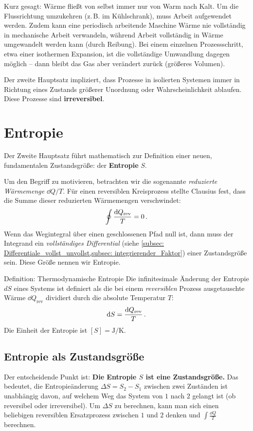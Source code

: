 Kurz gesagt: Wärme fließt von selbst immer nur von Warm nach Kalt. Um die Flussrichtung umzukehren (z.\,B. im Kühlschrank), muss Arbeit aufgewendet werden. Zudem kann eine periodisch arbeitende Maschine Wärme nie vollständig in mechanische Arbeit verwandeln, während Arbeit vollständig in Wärme umgewandelt werden kann (\zB durch Reibung). Bei einem einzelnen Prozessschritt, etwa einer isothermen Expansion, ist die vollständige Umwandlung dagegen möglich -- dann bleibt das Gas aber verändert zurück (größeres Volumen).

Der zweite Hauptsatz impliziert, dass Prozesse in isolierten Systemen immer in Richtung eines Zustands größerer Unordnung oder Wahrscheinlichkeit ablaufen. Diese Prozesse sind \textbf{irreversibel}.

\section{Entropie}\label{sec: entropie}
Der Zweite Hauptsatz führt mathematisch zur Definition einer neuen, fundamentalen Zustandsgröße: der \textbf{Entropie} $S$.

Um den Begriff zu motivieren, betrachten wir die sogenannte \textit{reduzierte Wärmemenge} $\dd Q/T$. Für einen reversiblen Kreisprozess stellte Clausius fest, dass die Summe dieser reduzierten Wärmemengen verschwindet:
\begin{equation}
    \oint \frac{\mathrm{d} Q_{\text{rev}}}{T} = 0 \,.
\end{equation}
Wenn das Wegintegral über einen geschlossenen Pfad null ist, dann muss der Integrand ein \textit{vollständiges Differential} (siehe \cref{subsec: Differentiale_vollst_unvollst,subsec: integrierender_Faktor}) einer Zustandsgröße sein. Diese Größe nennen wir Entropie.

\begin{importantbox}{Definition: Thermodynamische Entropie}
    Die infinitesimale Änderung der Entropie $dS$ eines Systems ist definiert als die bei einem \textit{reversiblen} Prozess ausgetauschte Wärme $\dd Q_{\text{rev}}$ dividiert durch die absolute Temperatur $T$:
    \begin{equation}\label{eq: entropie_def}
        \mathrm{d} S = \frac{\mathrm{d} Q_{\text{rev}}}{T} \,.
    \end{equation}
    Die Einheit der Entropie ist $[S] = \si{\joule\per\kelvin}$.
\end{importantbox}

\subsection{Entropie als Zustandsgröße}
Der entscheidende Punkt ist: \textbf{Die Entropie $S$ ist eine Zustandsgröße.} 
Das bedeutet, die Entropieänderung $\Delta S = S_2 - S_1$ zwischen zwei Zuständen ist unabhängig davon, auf welchem Weg das System von $1$ nach $2$ gelangt ist (ob reversibel oder irreversibel). 
Um $\Delta S$ zu berechnen, kann man sich einen beliebigen reversiblen Ersatzprozess zwischen $1$ und $2$ denken und $\int \frac{\dd Q}{T}$ berechnen.

